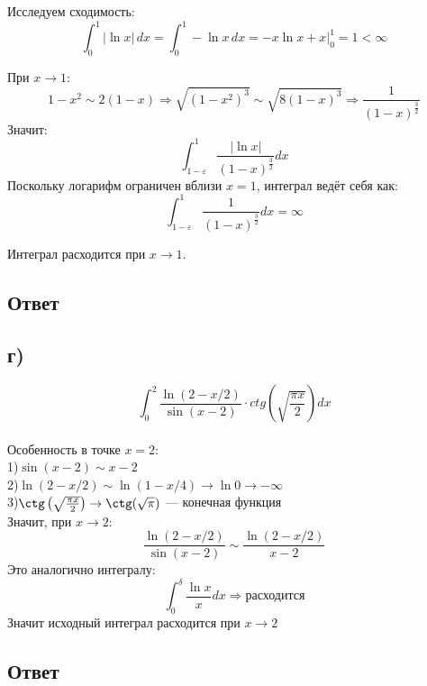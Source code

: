 \documentclass{article}
\begin{document}
Исследуем сходимость:
\[
\int_0^1 |\ln x| \, dx = \int_0^1 -\ln x \, dx = \left. -x \ln x + x \right|_0^1 = 1 < \infty
\]

При $x \to 1$:
\[
1 - x^2 \sim 2(1 - x) \Rightarrow \sqrt{(1 - x^2)^3} \sim \sqrt{8(1 - x)^3} \Rightarrow \frac{1}{(1 - x)^{\frac{3}{2}}}
\]
Значит:
\[
\int_{1 - \varepsilon}^1 \frac{|\ln x|}{(1 - x)^{\frac{3}{2}}} dx
\]
Поскольку логарифм ограничен вблизи $x = 1$, интеграл ведёт себя как:
\[
\int_{1 - \varepsilon}^1 \frac{1}{(1 - x)^{\frac{3}{2}}} dx = \infty
\]

Интеграл расходится при $x \to 1$.
\subsection*{Ответ}
\subsection*{г)}
\[
\int_0^2 \frac{\ln(2 - x/2)}{\sin(x - 2)} \cdot ctg\left(\sqrt{\frac{\pi x}{2}}\right) dx
\]\\

Особенность в точке $x = 2$:\\
1)$\sin(x - 2) \sim x - 2$\\
2)$\ln(2 - x/2) \sim \ln(1 - x/4) \to \ln 0 \to -\infty$\\
3)$\ctg\left(\sqrt{\frac{\pi x}{2}}\right) \to \ctg(\sqrt{\pi})$ — конечная функция\\

Значит, при $x \to 2$:
\[
\frac{\ln(2 - x/2)}{\sin(x - 2)} \sim \frac{\ln(2 - x/2)}{x - 2}
\]
Это аналогично интегралу:
\[
\int_0^\delta \frac{\ln x}{x} dx \Rightarrow \text{расходится}
\]
Значит исходный интеграл расходится при $x \to 2$
\subsection*{Ответ}
\end{document}
